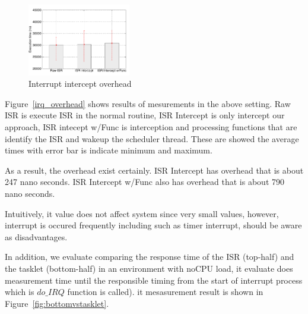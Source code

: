 

\begin{figure}[t]
\begin{center}
\includegraphics[width=0.4\textwidth]{img/interrupt.pdf}
\caption{Interrupt intercept overhead}
\end{center}
\label{fig:irq_overhead}
\end{figure}

Figure~\ref{irq_overhead} shows results of mesurements in the above setting.
Raw ISR is execute ISR in the normal routine, ISR Intercept is only intercept our approach,
ISR intecept w/Func is interception and processing functions that are identify the ISR and wakeup the scheduler thread.
These are showed the average times with error bar is indicate minimum and maximum.

As a result, the overhead exist certainly.
ISR Intercept has overhead that is about 247 nano seconds.
ISR Intercept w/Func also has overhead that is about 790 nano seconds.

Intuitively, it value does not affect system since very small values,
however, interrupt is occured frequently including such as timer interrupt, should be aware as disadvantages.

In addition, we evaluate comparing the response time of the ISR (top-half) and the tasklet (bottom-half) in an environment with noCPU load,
it evaluate does measurement time until the responsible timing from the start of interrupt process which is $do\_IRQ$ function is called).
it mesasurement result is shown in Figure~\ref{fig:bottomvstasklet}.

